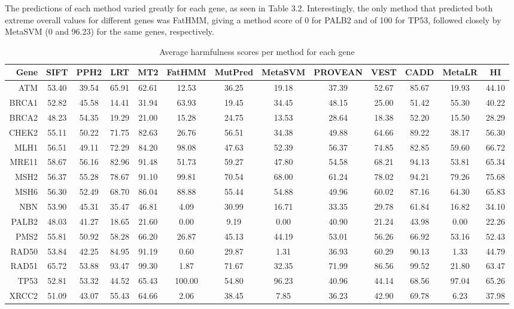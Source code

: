 \documentclass[12pt,MSc,wordcount,anon]{muthesis}
\begin{document}
\begin{flushleft}
The predictions of each method varied greatly for each gene, as seen in Table 3.2. Interestingly, the only method that predicted both extreme overall values for different genes was FatHMM, giving a method score of 0 for PALB2 and of 100 for TP53, followed closely by MetaSVM (0 and 96.23) for the same genes, respectively.

\begin{table}
    \centering
    \begin{tabular}
{|r|c|c|c|c|c|c|c|c|c|c|c|c|}\hline\hline
Gene&SIFT&PPH2&LRT&MT2&FatHMM&MutPred&MetaSVM&PROVEAN&VEST&CADD&MetaLR&HI\\\hline
ATM&53.40&39.54&65.91&62.61&12.53&36.25&19.18&37.39&52.67&85.67&19.93&44.10\\
BRCA1&52.82&45.58&14.41&31.94&63.93&19.45&34.45&48.15&25.00&51.42&55.30&40.22\\
BRCA2&48.23&54.35&19.29&21.00&15.28&24.75&13.53&28.64&18.38&52.20&15.50&28.29\\
CHEK2&55.11&50.22&71.75&82.63&26.76&56.51&34.38&49.88&64.66&89.22&38.17&56.30\\
MLH1&56.51&49.11&72.29&84.20&98.08&47.63&52.39&56.37&74.85&82.85&59.60&66.72\\
MRE11&58.67&56.16&82.96&91.48&51.73&59.27&47.80&54.58&68.21&94.13&53.81&65.34\\
MSH2&56.37&55.28&78.67&91.10&99.81&70.54&68.00&61.24&78.02&94.21&79.26&75.68\\
MSH6&56.30&52.49&68.70&86.04&88.88&55.44&54.88&49.96&60.02&87.16&64.30&65.83\\
NBN&53.90&45.31&35.47&46.81&4.09&30.99&16.71&33.35&29.78&61.84&16.82&34.10\\
PALB2&48.03&41.27&18.65&21.60&0.00&9.19&0.00&40.90&21.24&43.98&0.00&22.26\\
PMS2&55.81&50.92&58.28&66.20&26.87&45.13&44.19&53.01&56.26&66.92&53.16&52.43\\
RAD50&53.84&42.25&84.95&91.19&0.60&29.87&1.31&36.93&60.29&90.13&1.33&44.79\\
RAD51&65.72&53.88&93.47&99.30&1.87&71.67&32.35&71.99&86.56&99.52&21.80&63.47\\
TP53&52.81&53.32&44.52&65.43&100.00&54.80&96.23&40.96&44.14&68.56&97.04&65.26\\
XRCC2&51.09&43.07&55.43&64.66&2.06&38.45&7.85&36.23&42.90&69.78&6.23&37.98\\\hline\hline
    \end{tabular}
    \caption{Average harmfulness scores per method for each gene}
\end{table}


\end{flushleft}
\end{document}
